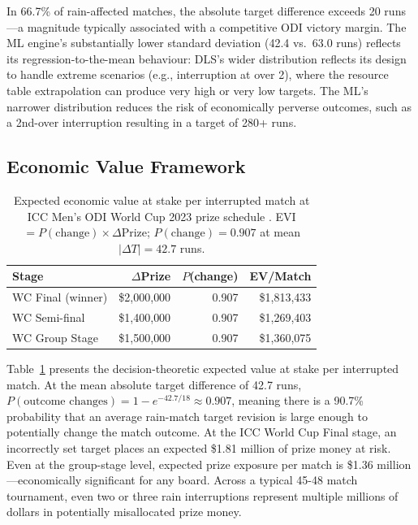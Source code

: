 \documentclass[10pt,a4paper,twocolumn]{article}
\begin{document}
In 66.7\% of rain-affected matches, the absolute target difference exceeds 20 runs---a magnitude typically associated with a competitive ODI victory margin. The ML engine's substantially lower standard deviation (42.4 vs.\ 63.0 runs) reflects its regression-to-the-mean behaviour: DLS's wider distribution reflects its design to handle extreme scenarios (e.g., interruption at over 2), where the resource table extrapolation can produce very high or very low targets. The ML's narrower distribution reduces the risk of economically perverse outcomes, such as a 2nd-over interruption resulting in a target of 280+ runs.

\subsection{Economic Value Framework}

\begin{table}[htbp]
\centering
\caption{Expected economic value at stake per interrupted match at ICC Men's ODI World Cup 2023 prize schedule \citep{ICC2023prizes}. EVI $= P(\text{change}) \times \Delta\text{Prize}$; $P(\text{change})=0.907$ at mean $|\Delta T|=42.7$ runs.}
\label{tab:econ_value}
\small
\begin{tabular}{lrrr}
\toprule
\textbf{Stage} & $\Delta$\textbf{Prize} & $P$\textbf{(change)} & \textbf{EV/Match} \\
\midrule
WC Final (winner) & \$2{,}000{,}000 & 0.907 & \$1{,}813{,}433 \\
WC Semi-final     & \$1{,}400{,}000 & 0.907 & \$1{,}269{,}403 \\
WC Group Stage    & \$1{,}500{,}000 & 0.907 & \$1{,}360{,}075 \\
\bottomrule
\end{tabular}
\end{table}

Table~\ref{tab:econ_value} presents the decision-theoretic expected value at stake per interrupted match. At the mean absolute target difference of 42.7 runs, $P(\text{outcome changes}) = 1 - e^{-42.7/18} \approx 0.907$, meaning there is a 90.7\% probability that an average rain-match target revision is large enough to potentially change the match outcome. At the ICC World Cup Final stage, an incorrectly set target places an expected \$1.81 million of prize money at risk. Even at the group-stage level, expected prize exposure per match is \$1.36 million---economically significant for any board. Across a typical 45-48 match tournament, even two or three rain interruptions represent multiple millions of dollars in potentially misallocated prize money.
\end{document}
